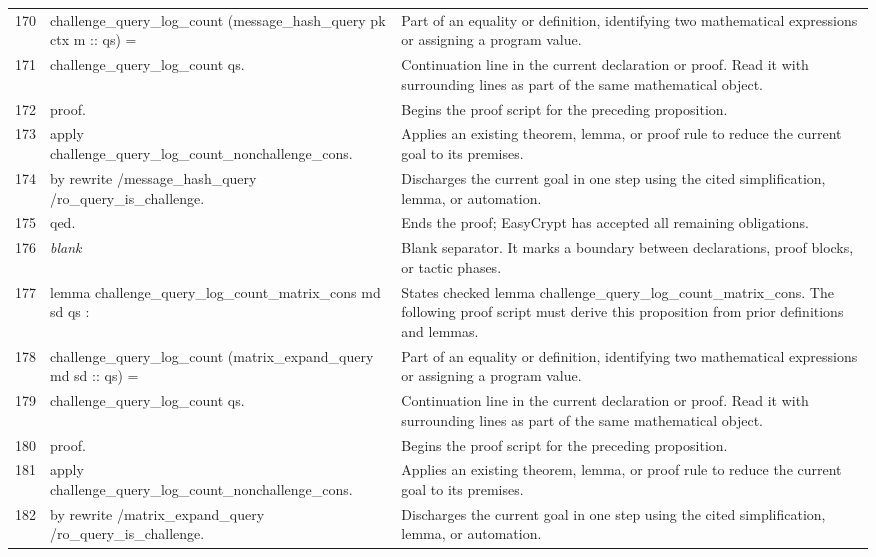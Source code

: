 \documentclass[10pt]{article}
\begin{document}
\begin{longtable}{r L{0.53\textwidth} L{0.37\textwidth}}
170 & {\ttfamily\scriptsize   challenge\_query\_log\_count (message\_hash\_query pk ctx m :: qs) =} & Part of an equality or definition, identifying two mathematical expressions or assigning a program value. \\
171 & {\ttfamily\scriptsize   challenge\_query\_log\_count qs.} & Continuation line in the current declaration or proof.  Read it with surrounding lines as part of the same mathematical object. \\
172 & {\ttfamily\scriptsize proof.} & Begins the proof script for the preceding proposition. \\
173 & {\ttfamily\scriptsize apply challenge\_query\_log\_count\_nonchallenge\_cons.} & Applies an existing theorem, lemma, or proof rule to reduce the current goal to its premises. \\
174 & {\ttfamily\scriptsize by rewrite /message\_hash\_query /ro\_query\_is\_challenge.} & Discharges the current goal in one step using the cited simplification, lemma, or automation. \\
175 & {\ttfamily\scriptsize qed.} & Ends the proof; EasyCrypt has accepted all remaining obligations. \\
176 & {\ttfamily\scriptsize \emph{blank}} & Blank separator.  It marks a boundary between declarations, proof blocks, or tactic phases. \\
177 & {\ttfamily\scriptsize lemma challenge\_query\_log\_count\_matrix\_cons md sd qs :} & States checked lemma challenge\_query\_log\_count\_matrix\_cons.  The following proof script must derive this proposition from prior definitions and lemmas. \\
178 & {\ttfamily\scriptsize   challenge\_query\_log\_count (matrix\_expand\_query md sd :: qs) =} & Part of an equality or definition, identifying two mathematical expressions or assigning a program value. \\
179 & {\ttfamily\scriptsize   challenge\_query\_log\_count qs.} & Continuation line in the current declaration or proof.  Read it with surrounding lines as part of the same mathematical object. \\
180 & {\ttfamily\scriptsize proof.} & Begins the proof script for the preceding proposition. \\
181 & {\ttfamily\scriptsize apply challenge\_query\_log\_count\_nonchallenge\_cons.} & Applies an existing theorem, lemma, or proof rule to reduce the current goal to its premises. \\
182 & {\ttfamily\scriptsize by rewrite /matrix\_expand\_query /ro\_query\_is\_challenge.} & Discharges the current goal in one step using the cited simplification, lemma, or automation. \\

\end{longtable}
\end{document}
